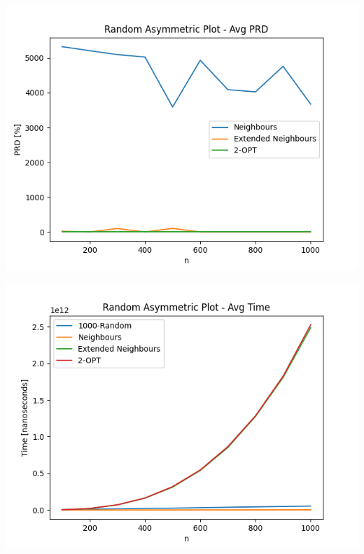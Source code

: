 \documentclass{article}
\begin{document}
\begin{center}
\includegraphics[width=\textwidth, 
                   height = 0.4\textheight, 
                   keepaspectratio]
                  {generated_asym_avg_prd_no_krandom} 
\end{center}

\begin{center}
\includegraphics[width=\textwidth, 
                   height = 0.4\textheight, 
                   keepaspectratio]
                  {generated_asym_avg_time} 
\end{center}
\end{document}
